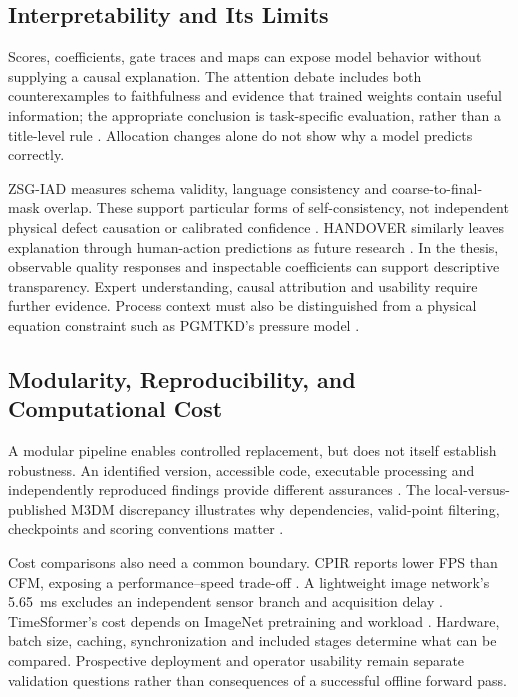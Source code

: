 \subsection{Interpretability and Its Limits}
Scores, coefficients, gate traces and maps can expose model behavior without supplying a causal explanation. The attention debate includes both counterexamples to faithfulness and evidence that trained weights contain useful information; the appropriate conclusion is task-specific evaluation, rather than a title-level rule \citep{P036}. Allocation changes alone do not show why a model predicts correctly.

ZSG-IAD measures schema validity, language consistency and coarse-to-final-mask overlap. These support particular forms of self-consistency, not independent physical defect causation or calibrated confidence \citep{P025}. HANDOVER similarly leaves explanation through human-action predictions as future research \citep{Thoduka2024Handover}. In the thesis, observable quality responses and inspectable coefficients can support descriptive transparency. Expert understanding, causal attribution and usability require further evidence. Process context must also be distinguished from a physical equation constraint such as PGMTKD's pressure model \citep{Li2025PGMTKD}.

\subsection{Modularity, Reproducibility, and Computational Cost}
A modular pipeline enables controlled replacement, but does not itself establish robustness. An identified version, accessible code, executable processing and independently reproduced findings provide different assurances \citep{P009}. The local-versus-published M3DM discrepancy illustrates why dependencies, valid-point filtering, checkpoints and scoring conventions matter \citep{P033}.

Cost comparisons also need a common boundary. CPIR reports lower FPS than CFM, exposing a performance--speed trade-off \citep{Shangguan2025CPIR}. A lightweight image network's 5.65~ms excludes an independent sensor branch and acquisition delay \citep[PDF p.~10, Table~V]{P035}. TimeSformer's cost depends on ImageNet pretraining and workload \citep{P034}. Hardware, batch size, caching, synchronization and included stages determine what can be compared. Prospective deployment and operator usability remain separate validation questions rather than consequences of a successful offline forward pass.

